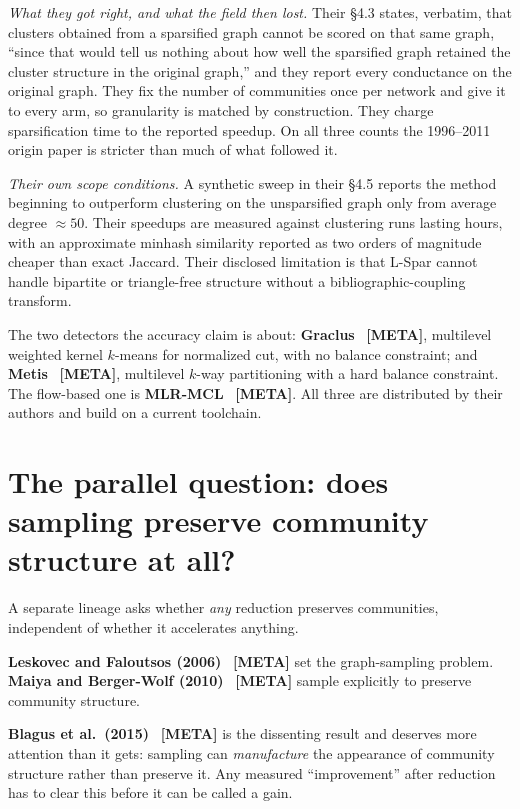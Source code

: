 \documentclass[10pt,a4paper]{article}
\begin{document}
\emph{What they got right, and what the field then lost.} Their \S4.3 states, verbatim, that
clusters obtained from a sparsified graph cannot be scored on that same graph, ``since that
would tell us nothing about how well the sparsified graph retained the cluster structure in the
original graph,'' and they report every conductance on the original graph. They fix the number
of communities once per network and give it to every arm, so granularity is matched by
construction. They charge sparsification time to the reported speedup. On all three counts the
1996--2011 origin paper is stricter than much of what followed it.

\emph{Their own scope conditions.} A synthetic sweep in their \S4.5 reports the method beginning
to outperform clustering on the unsparsified graph only from average degree $\approx 50$. Their
speedups are measured against clustering runs lasting hours, with an approximate minhash
similarity reported as two orders of magnitude cheaper than exact Jaccard. Their disclosed
limitation is that L-Spar cannot handle bipartite or triangle-free structure without a
bibliographic-coupling transform.

The two detectors the accuracy claim is about:
\textbf{Graclus}~\cite{dhillon2007weighted} \textbf{[META]}, multilevel weighted kernel
$k$-means for normalized cut, with no balance constraint; and
\textbf{Metis}~\cite{karypis1998metis} \textbf{[META]}, multilevel $k$-way partitioning with a
hard balance constraint. The flow-based one is
\textbf{MLR-MCL}~\cite{satuluri2009scalable} \textbf{[META]}. All three are distributed by their
authors and build on a current toolchain.

\section{The parallel question: does sampling preserve community structure at all?}

A separate lineage asks whether \emph{any} reduction preserves communities, independent of
whether it accelerates anything.

\textbf{Leskovec and Faloutsos (2006)}~\cite{leskovec2006sampling} \textbf{[META]} set the
graph-sampling problem. \textbf{Maiya and Berger-Wolf (2010)}~\cite{maiya2010sampling}
\textbf{[META]} sample explicitly to preserve community structure.

\textbf{Blagus et al.\ (2015)}~\cite{blagus2015sampling} \textbf{[META]} is the dissenting
result and deserves more attention than it gets: sampling can \emph{manufacture} the appearance
of community structure rather than preserve it. Any measured ``improvement'' after reduction has
to clear this before it can be called a gain.
\end{document}
